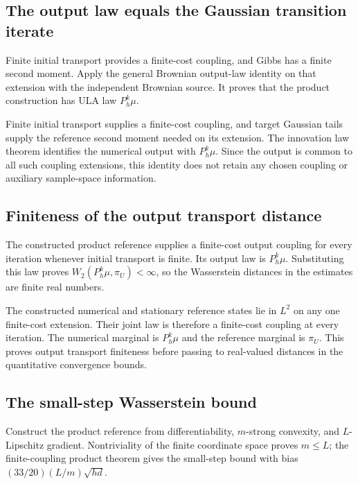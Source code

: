 \documentclass[11pt,a4paper]{article}
\begin{document}
\subsection{\texorpdfstring{The output law equals the Gaussian transition iterate}{The output law equals the Gaussian transition iterate}}


Finite initial transport provides a finite-cost coupling, and Gibbs has a finite second moment. Apply the general Brownian output-law identity on that extension with the independent Brownian source. It proves that the product construction has ULA law \(P_h^k\mu\).



Finite initial transport supplies a finite-cost coupling, and target Gaussian tails supply the reference second moment needed on its extension. The innovation law theorem identifies the numerical output with \(P_h^k\mu\). Since the output is common to all such coupling extensions, this identity does not retain any chosen coupling or auxiliary sample-space information.


\subsection{\texorpdfstring{Finiteness of the output transport distance}{Finiteness of the output transport distance}}


The constructed product reference supplies a finite-cost output coupling for every iteration whenever initial transport is finite. Its output law is \(P_h^k\mu\). Substituting this law proves \(W_2(P_h^k\mu,\pi_U)<\infty\), so the Wasserstein distances in the estimates are finite real numbers.



The constructed numerical and stationary reference states lie in \(L^2\) on any one finite-cost extension. Their joint law is therefore a finite-cost coupling at every iteration. The numerical marginal is \(P_h^k\mu\) and the reference marginal is \(\pi_U\). This proves output transport finiteness before passing to real-valued distances in the quantitative convergence bounds.


\subsection{\texorpdfstring{The small-step Wasserstein bound}{The small-step Wasserstein bound}}


Construct the product reference from differentiability, \(m\)-strong convexity, and \(L\)-Lipschitz gradient. Nontriviality of the finite coordinate space proves \(m\le L\); the finite-coupling product theorem gives the small-step bound with bias \((33/20)(L/m)\sqrt{hd}\).
\end{document}
